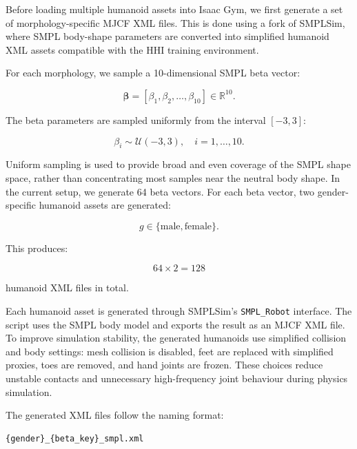 \documentclass[11pt,a4paper]{article}
\begin{document}
Before loading multiple humanoid assets into Isaac Gym, we first generate a set of morphology-specific MJCF XML files.
This is done using a fork of SMPLSim, where SMPL body-shape parameters are converted into simplified humanoid XML assets compatible with the HHI training environment.

For each morphology, we sample a 10-dimensional SMPL beta vector:

\begin{equation}
    \boldsymbol{\beta} =
    [\beta_1, \beta_2, \dots, \beta_{10}] \in \mathbb{R}^{10}.
\end{equation}

The beta parameters are sampled uniformly from the interval $[-3, 3]$:

\begin{equation}
    \beta_i \sim \mathcal{U}(-3, 3), \quad i = 1,\dots,10.
\end{equation}

Uniform sampling is used to provide broad and even coverage of the SMPL shape space, rather than concentrating most samples near the neutral body shape.
In the current setup, we generate 64 beta vectors.
For each beta vector, two gender-specific humanoid assets are generated:

\begin{equation}
    g \in \{\text{male}, \text{female}\}.
\end{equation}

This produces:

\begin{equation}
    64 \times 2 = 128
\end{equation}

humanoid XML files in total.

Each humanoid asset is generated through SMPLSim's \texttt{SMPL\_Robot} interface.
The script uses the SMPL body model and exports the result as an MJCF XML file.
To improve simulation stability, the generated humanoids use simplified collision and body settings: mesh collision is disabled, feet are replaced with simplified proxies, toes are removed, and hand joints are frozen.
These choices reduce unstable contacts and unnecessary high-frequency joint behaviour during physics simulation.

The generated XML files follow the naming format:

\begin{lstlisting}
{gender}_{beta_key}_smpl.xml
\end{lstlisting}
\end{document}
